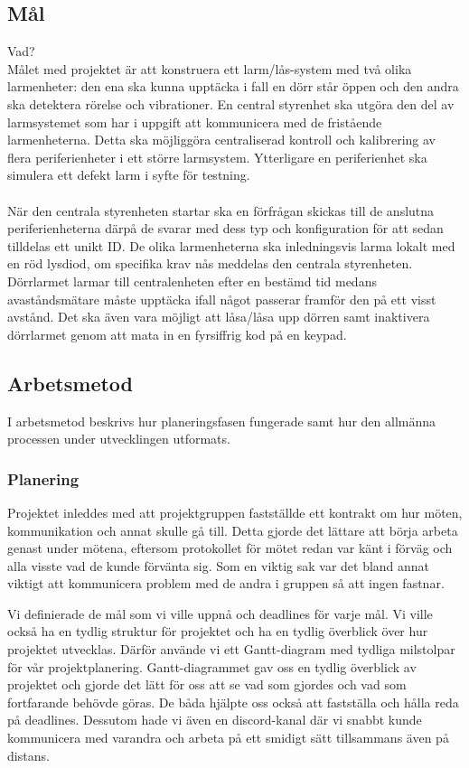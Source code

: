 \documentclass{article}
\begin{document}
\subsection{Mål}
Vad?
\\
Målet med projektet är att konstruera ett larm/lås-system med två olika larmenheter: 
den ena ska kunna upptäcka i fall en dörr står öppen och den andra ska detektera rörelse och vibrationer. 
En central styrenhet ska utgöra den del av larmsystemet som har i uppgift att kommunicera med de fristående larmenheterna. 
Detta ska möjliggöra centraliserad kontroll och kalibrering av flera periferienheter i ett större larmsystem. 
Ytterligare en periferienhet ska simulera ett defekt larm i syfte för testning.
\\\\
När den centrala styrenheten startar ska en förfrågan skickas till de anslutna periferienheterna därpå de svarar med dess typ och konfiguration för att sedan tilldelas ett unikt ID. De olika larmenheterna ska inledningsvis larma lokalt med en röd lysdiod, om specifika krav nås meddelas den centrala styrenheten. Dörrlarmet larmar till centralenheten efter en bestämd tid medans avaståndsmätare måste upptäcka ifall något passerar framför den på ett visst avstånd. Det ska även vara möjligt att låsa/låsa upp dörren samt inaktivera dörrlarmet genom att mata in en fyrsiffrig kod på en keypad.


\subsection{Arbetsmetod}
I arbetsmetod beskrivs hur planeringsfasen fungerade samt hur den allmänna processen under utvecklingen utformats.

\subsubsection{Planering}
Projektet inleddes med att projektgruppen fastställde ett kontrakt om hur möten, kommunikation och annat skulle gå till.
Detta gjorde det lättare att börja arbeta genast under mötena, eftersom protokollet för mötet redan var känt i förväg och alla visste vad de kunde förvänta sig.
Som en viktig sak var det bland annat viktigt att kommunicera problem med de andra i gruppen så att ingen fastnar.

Vi definierade de mål som vi ville uppnå och deadlines för varje mål. 
Vi ville också ha en tydlig struktur för projektet och ha en tydlig överblick över hur projektet utvecklas.
Därför använde vi ett Gantt-diagram med tydliga milstolpar för vår projektplanering.
Gantt-diagrammet gav oss en tydlig överblick av projektet och gjorde det lätt för oss att se vad som gjordes och vad som fortfarande behövde göras.
De båda hjälpte oss också att fastställa och hålla reda på deadlines. 
Dessutom hade vi även en discord-kanal där vi snabbt kunde kommunicera med varandra och arbeta på ett smidigt sätt tillsammans även på distans.
\end{document}

